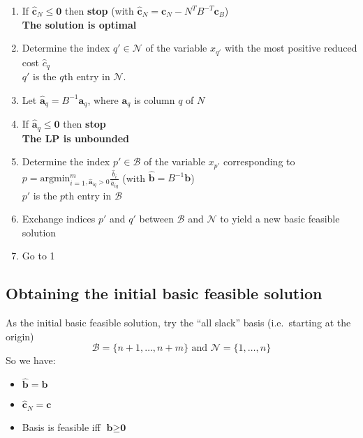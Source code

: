 \documentclass[11pt,a4paper]{article}
\begin{document}
\begin{enumerate}

    \item If $\widehat{\textbf{c}}_N \le \textbf{0}$ then \textbf{stop}
        (with $\widehat{\textbf{c}}_N = \textbf{c}_N - {N^T} B^{-T}\textbf{c}_B$)\\
        \textbf{The solution is optimal}

    \item Determine the index $q' \in \mathcal{N}$ of the variable $x_{q'}$ with the most
        positive reduced cost $\widehat{c}_q$ \\
        $q'$ is the $q\text{th}$ entry in $\mathcal{N}$.

    \item Let $\widehat{\textbf{a}}_q = B^{-1}\textbf{a}_q$,
        where $\textbf{a}_q$ is column $q$ of $N$

    \item If $\widehat{\textbf{a}}_q \le \textbf{0}$ then \textbf{stop} \\
        \textbf{The LP is unbounded}

    \item Determine the index $p' \in \mathcal{B}$ of the variable $x_{p'}$ corresponding to
        $p = \text{argmin}_{i=1}^m_{,\widehat{\textbf{a}}_{iq}>0}
        \frac{\widehat{b}_i}{\widehat{a}_{iq}}$ (with $\widehat{\textbf{b}} = B^{-1}\textbf{b}$)\\
        $p'$ is the $p\text{th}$ entry in $\mathcal{B}$

    \item Exchange indices $p'$ and $q'$ between $\mathcal{B}$ and $\mathcal{N}$
        to yield a new basic feasible solution

    \item Go to 1

\end{enumerate}

\subsection*{Obtaining the initial basic feasible solution}

As the initial basic feasible solution, try the ``all slack'' basis (i.e.\ starting at the origin)
\[
    \mathcal{B} = \{ n+1, \ldots, n+m \} \text{ and } \mathcal{N} = \{ 1, \ldots, n \}
\]
So we have:
\begin{itemize}
    \item $\widehat{\textbf{b}} = \textbf{b}$
    \item $\widehat{\textbf{c}}_N = \textbf{c}$
    \item Basis is feasible iff $\textbf{b} \ge \textbf{0}$
\end{itemize}
\end{document}
